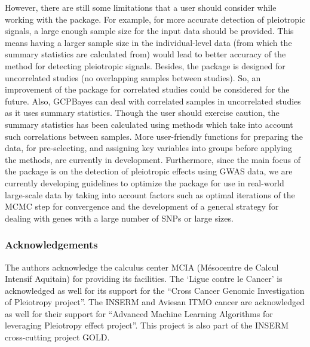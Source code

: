 However, there are still some limitations that a user should consider while working with the package. For example, for more accurate detection of pleiotropic signals, a large enough sample size for the input data should be provided. This means having a larger sample size in the individual-level data
(from which the summary statistics are calculated from) would lead to better accuracy of the method for detecting pleiotropic signals.
Besides, the  package is designed for uncorrelated studies (no overlapping samples between studies). So, an improvement of the package for correlated studies could be considered for the future.
Also, GCPBayes can deal with correlated samples in uncorrelated studies as it uses summary statistics. Though the user should exercise caution, the summary statistics has been calculated using methods which take into account such correlations between samples.
More user-friendly functions for preparing the data, for pre-selecting, and assigning key variables into groups before applying the  methods, are currently in development.
Furthermore, since the main focus of the package is on the detection of pleiotropic effects using GWAS data, we are currently developing guidelines to optimize
the package for use in real-world large-scale data by taking into account factors such as optimal
iterations of the MCMC step for convergence and the development of a general strategy for dealing with
genes with a large number of SNPs or large sizes.

\hypertarget{acknowledgements}{%
\subsubsection{Acknowledgements}\label{acknowledgements}}

The authors acknowledge the calculus center MCIA (Mésocentre de Calcul Intensif Aquitain) for providing its facilities. The `Ligue contre le Cancer' is acknowledged as well for its support for the ``Cross Cancer Genomic Investigation of Pleiotropy project''. The INSERM and Aviesan ITMO cancer are acknowledged as well for their support for ``Advanced Machine Learning Algorithms for leveraging Pleiotropy effect project''. This project is also part of the INSERM cross-cutting project GOLD.

\hypertarget{section}{%
\subsection{}\label{section}}

